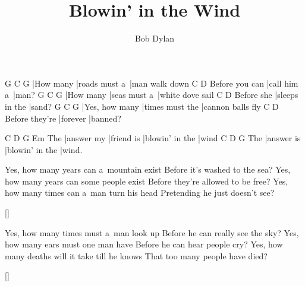 \documentclass{song}
\title{Blowin' in the Wind}
\author{Bob Dylan}
\begin{document}
\strophe
G         C             G
|How many |roads must a~|man walk down
               C           D
Before you can |call him a~|man?
G         C            G
|How many |seas must a~|white dove sail
           C              D
Before she |sleeps in the |sand?
G              C               G
|Yes, how many |times must the |cannon balls fly
               C        D
Before they're |forever |banned?
\endstrophe

    C          D          G               Em
The |answer my |friend is |blowin' in the |wind
    C          D               G
The |answer is |blowin' in the |wind.
\endstrophe

\strophe*
Yes, how many years can a~mountain exist
Before it's washed to the sea?
Yes, how many years can some people exist
Before they're allowed to be free?
Yes, how many times can a~man turn his head
Pretending he just doesn't see?
\endstrophe

\ref{}

\strophe*
Yes, how many times must a~man look up
Before he can really see the sky?
Yes, how many ears must one man have
Before he can hear people cry?
Yes, how many deaths will it take till he knows
That too many people have died?
\endstrophe


\ref{}
\end{document}
